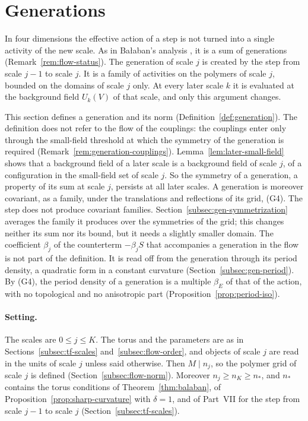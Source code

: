 \section{Generations}\label{sec:generations}

In four dimensions the effective action of a step is not turned into a single activity of the new scale. As in Ba\l aban's analysis \cite[(0.22)--(0.23)]{BalYM4I}, it is a sum of generations (Remark~\ref{rem:flow-status}). The generation of scale $j$ is created by the step from scale $j-1$ to scale $j$. It is a family of activities on the polymers of scale $j$, bounded on the domains of scale $j$ only. At every later scale $k$ it is evaluated at the background field $U_k(V)$ of that scale, and only this argument changes.

This section defines a generation and its norm (Definition~\ref{def:generation}). The definition does not refer to the flow of the couplings: the couplings enter only through the small-field threshold at which the symmetry of the generation is required (Remark~\ref{rem:generation-couplings}). Lemma~\ref{lem:later-small-field} shows that a background field of a later scale is a background field of scale $j$, of a configuration in the small-field set of scale $j$. So the symmetry of a generation, a property of its sum at scale $j$, persists at all later scales. A generation is moreover covariant, as a family, under the translations and reflections of its grid, (G4). The step does not produce covariant families. Section~\ref{subsec:gen-symmetrization} averages the family it produces over the symmetries of the grid; this changes neither its sum nor its bound, but it needs a slightly smaller domain. The coefficient $\beta_j$ of the counterterm $-\beta_jS$ that accompanies a generation in the flow is not part of the definition. It is read off from the generation through its period density, a quadratic form in a constant curvature (Section~\ref{subsec:gen-period}). By (G4), the period density of a generation is a multiple $\beta_E$ of that of the action, with no topological and no anisotropic part (Proposition~\ref{prop:period-iso}).

\paragraph{Setting.} The scales are $0\le j\le K$. The torus and the parameters are as in Sections~\ref{subsec:tf-scales} and~\ref{subsec:flow-order}, and objects of scale $j$ are read in the units of scale $j$ unless said otherwise. Then $M\mid n_j$, so the polymer grid of scale $j$ is defined (Section~\ref{subsec:flow-norm}). Moreover $n_j\ge n_K\ge n_*$, and $n_*$ contains the torus conditions of Theorem~\ref{thm:balaban}, of Proposition~\ref{prop:sharp-curvature} with $\delta=1$, and of Part~VII for the step from scale $j-1$ to scale $j$ (Section~\ref{subsec:tf-scales}).

